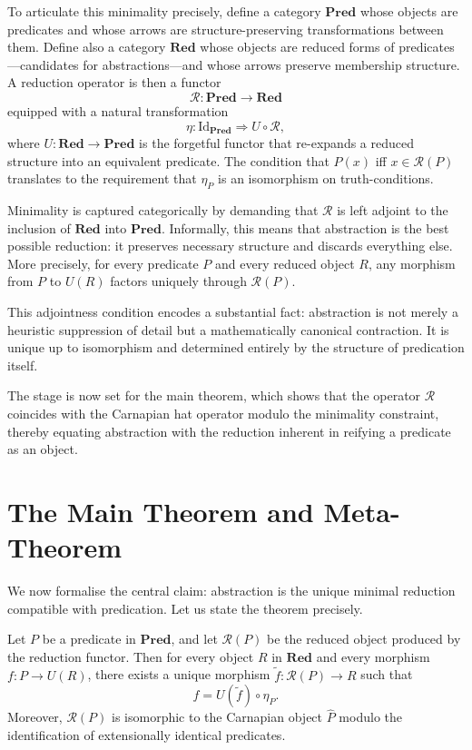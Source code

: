 \documentclass[12pt,letterpaper]{article}
\begin{document}
To articulate this minimality precisely, define a category $\mathbf{Pred}$ whose objects are predicates and whose arrows are structure-preserving transformations between them. Define also a category $\mathbf{Red}$ whose objects are reduced forms of predicates—candidates for abstractions—and whose arrows preserve membership structure. A reduction operator is then a functor
\[
\mathcal{R} : \mathbf{Pred} \to \mathbf{Red}
\]
equipped with a natural transformation
\[
\eta : \mathrm{Id}_{\mathbf{Pred}} \Rightarrow U \circ \mathcal{R},
\]
where $U : \mathbf{Red} \to \mathbf{Pred}$ is the forgetful functor that re-expands a reduced structure into an equivalent predicate. The condition that $P(x)$ iff $x \in \mathcal{R}(P)$ translates to the requirement that $\eta_P$ is an isomorphism on truth-conditions.

Minimality is captured categorically by demanding that $\mathcal{R}$ is left adjoint to the inclusion of $\mathbf{Red}$ into $\mathbf{Pred}$. Informally, this means that abstraction is the best possible reduction: it preserves necessary structure and discards everything else. More precisely, for every predicate $P$ and every reduced object $R$, any morphism from $P$ to $U(R)$ factors uniquely through $\mathcal{R}(P)$.

This adjointness condition encodes a substantial fact: abstraction is not merely a heuristic suppression of detail but a mathematically canonical contraction. It is unique up to isomorphism and determined entirely by the structure of predication itself.

The stage is now set for the main theorem, which shows that the operator $\mathcal{R}$ coincides with the Carnapian hat operator modulo the minimality constraint, thereby equating abstraction with the reduction inherent in reifying a predicate as an object.

\section{The Main Theorem and Meta-Theorem}

We now formalise the central claim: abstraction is the unique minimal reduction compatible with predication. Let us state the theorem precisely.

\begin{theorem}
Let $P$ be a predicate in $\mathbf{Pred}$, and let $\mathcal{R}(P)$ be the reduced object produced by the reduction functor. Then for every object $R$ in $\mathbf{Red}$ and every morphism $f : P \to U(R)$, there exists a unique morphism $\tilde{f} : \mathcal{R}(P) \to R$ such that
\[
f = U(\tilde{f}) \circ \eta_P.
\]
Moreover, $\mathcal{R}(P)$ is isomorphic to the Carnapian object $\hat{P}$ modulo the identification of extensionally identical predicates.
\end{theorem}
\end{document}
